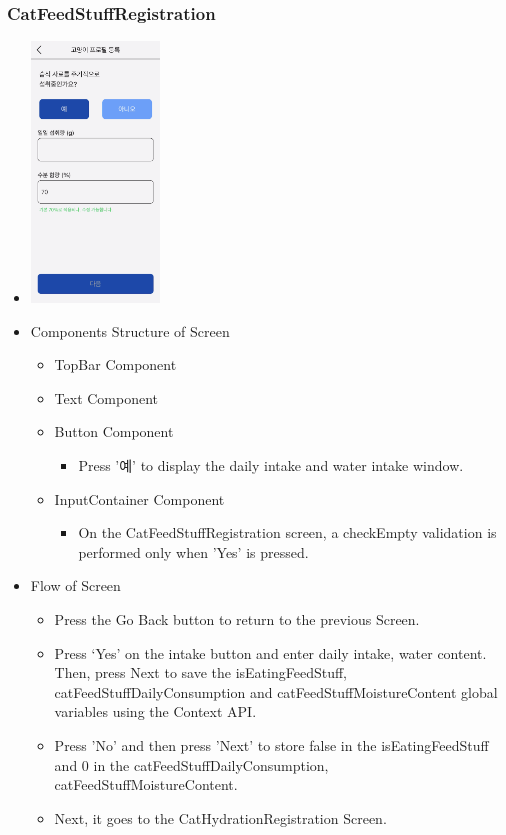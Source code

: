 \documentclass[conference]{IEEEtran}
\begin{document}
\subsubsection{CatFeedStuffRegistration}
\begin{itemize}
    \item[] \includegraphics[width=0.27\textwidth]{img/Screen/12_CatFeed.png}
    \item Components Structure of Screen
    \begin{itemize}
        \item TopBar Component
        \item Text Component
        \item Button Component
        \begin{itemize}
            \item Press '예' to display the daily intake and water intake window.
        \end{itemize}
        \item InputContainer Component
        \begin{itemize}
            \item On the CatFeedStuffRegistration screen, a checkEmpty validation is performed only when 'Yes' is pressed.
        \end{itemize}
    \end{itemize}
    \item Flow of Screen
    \begin{itemize}
        \item Press the Go Back button to return to the previous Screen.
        \item Press ‘Yes’ on the intake button and enter daily intake, water content. Then, press Next to save the isEatingFeedStuff, catFeedStuffDailyConsumption and catFeedStuffMoistureContent global variables using the Context API.
        \item Press 'No' and then press 'Next' to store false in the isEatingFeedStuff and 0 in the catFeedStuffDailyConsumption, catFeedStuffMoistureContent.
        \item Next, it goes to the CatHydrationRegistration Screen.
    \end{itemize}
\end{itemize}
\newpage
\end{document}
